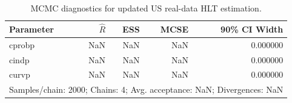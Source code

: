 \begin{table}[htbp]
\centering
\caption{MCMC diagnostics for updated US real-data HLT estimation.}
\label{tab:realdata_mcmc}
\begin{tabular}{lrrrr}
\toprule
Parameter & $\hat{R}$ & ESS & MCSE & 90\% CI Width \\
\midrule
cprobp & NaN & NaN & NaN & 0.000000 \\
cindp & NaN & NaN & NaN & 0.000000 \\
curvp & NaN & NaN & NaN & 0.000000 \\
\midrule
\multicolumn{5}{l}{Samples/chain: 2000; Chains: 4; Avg. acceptance: NaN; Divergences: NaN} \\
\bottomrule
\end{tabular}
\end{table}
